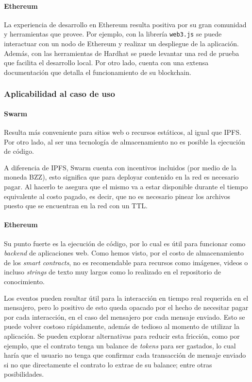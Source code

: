 \paragraph{Ethereum}
La experiencia de desarrollo en Ethereum resulta positiva por su gran comunidad y herramientas que provee. Por ejemplo, con la librería \texttt{web3.js} se puede interactuar con un nodo de Ethereum y realizar un despliegue de la aplicación. Además, con las herramientas de Hardhat se puede levantar una red de prueba que facilita el desarrollo local. Por otro lado, cuenta con una extensa documentación que detalla el funcionamiento de su blockchain.

\subsubsection{Aplicabilidad al caso de uso}

\paragraph{Swarm}
Resulta más conveniente para sitios web o recursos estáticos, al igual que IPFS. Por otro lado, al ser una tecnología de almacenamiento no es posible la ejecución de código.

A diferencia de IPFS, Swarm cuenta con incentivos incluidos (por medio de la moneda BZZ), esto significa que para deployar contenido en la red es necesario pagar. Al hacerlo te asegura que el mismo va a estar disponible durante el tiempo equivalente al costo pagado, es decir, que no es necesario pinear los archivos puesto que se encuentran en la red con un TTL.

\paragraph{Ethereum}
Su punto fuerte es la ejecución de código, por lo cual es útil para funcionar como \textit{backend} de aplicaciones web. Como hemos visto, por el costo de almacenamiento de los \textit{smart contracts}, no es recomendable para recursos como imágenes, videos o incluso \textit{strings} de texto muy largos como lo realizado en el repositorio de conocimiento. 

Los eventos pueden resultar útil para la interacción en tiempo real requerida en el mensajero, pero lo positivo de esto queda opacado por el hecho de necesitar pagar por cada interacción, en el caso del mensajero por cada mensaje enviado. Esto se puede volver costoso rápidamente, además de tedioso al momento de utilizar la aplicación. Se pueden explorar alternativas para reducir esta fricción, como por ejemplo, que el contrato tenga un balance de \textit{tokens} para ser gastados, lo cual haría que el usuario no tenga que confirmar cada transacción de mensaje enviado si no que directamente el contrato lo extrae de su balance; entre otras posibilidades.

